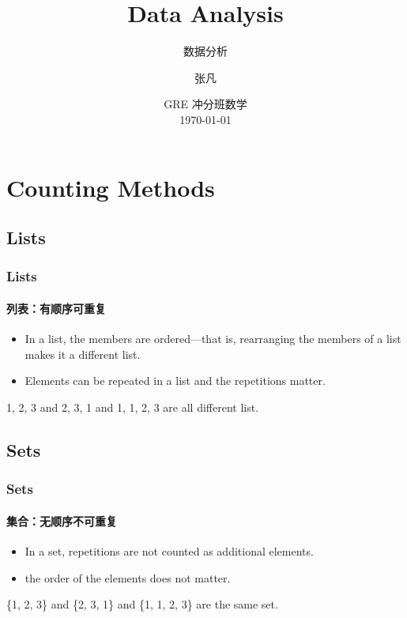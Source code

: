 \documentclass[
	11pt, %
]{beamer}
\title[Data Analysis]{Data Analysis} %
\subtitle{数据分析} %
\author[张凡]{张凡} %
\institute[XDF]{新东方国际教育 \\ \smallskip \textit{zhangfan@xdf.cn}} %
\date[\today]{GRE 冲分班数学 \\ \today} %
\begin{document}

\begin{frame}
	\titlepage %
\end{frame}




\section{Counting Methods}


\subsection{Lists}
\begin{frame}
	\frametitle{Lists} %
	\framesubtitle{列表：有顺序可重复}
	\begin{definition}
		\begin{itemize}
			\item In a list, the members are ordered—that is, rearranging the members of a list makes it a different list.
			\item Elements can be repeated in a list and the repetitions matter.
		\end{itemize}
	\end{definition}
	\begin{example}
		1, 2, 3 and 2, 3, 1 and 1, 1, 2, 3 are all different list. 
	\end{example}
\end{frame}


\subsection{Sets}
\begin{frame}
	\frametitle{Sets} %
	\framesubtitle{集合：无顺序不可重复}
	\begin{definition}
		\begin{itemize}
			\item In a set, repetitions are
not counted as additional elements.
			\item the order of the elements does not
matter.
		\end{itemize}
	\end{definition}
	\begin{example}
		\{1, 2, 3\} and \{2, 3, 1\} and \{1, 1, 2, 3\} are the same set. 
	\end{example}
\end{frame}
\end{document}
